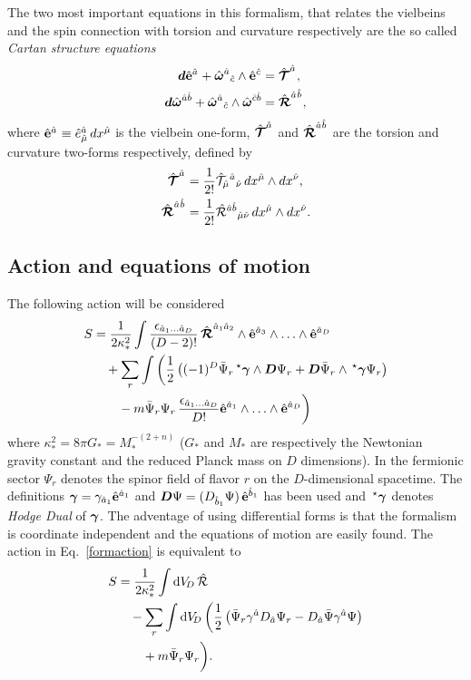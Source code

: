The two most important equations in this formalism, that relates the vielbeins and the spin connection with torsion and curvature respectively are the so called {\it{Cartan structure equations}} 
\begin{align}
  \label{cartantorsion}
  \df\vifhn{a}{} + \wfh^{\hat{a}}{}_{\hat{c}}\wedge\vifhn{c}{} &= \Tfhn{a}{}, \\
  \label{cartancurvature}
  \df\wfh^{\hat{a}\hat{b}} + \wfh^{\hat{a}}{}_{\hat{c}}\wedge\wfh^{\hat{c}\hat{b}} &= \Rfhn{a}{}{b}{},
\end{align}
where $\hat{{\bf{e}}}^{\hat{a}_{}} \equiv \hat{e}^{\hat{a}}_{\hat{\mu}}\,dx^{\hat{\mu}}$ is the vielbein one-form, $\hat{{\boldsymbol{\mathcal{T}}}}^{\hat{a}_{}}$ and $\hat{{\boldsymbol{\mathcal{R}}}}^{\hat{a}_{}\hat{b}_{}}$ are the torsion and curvature two-forms respectively, defined by
\begin{align}
  \hat{{\boldsymbol{\mathcal{T}}}}^{\hat{a}_{}} &= \frac{1}{2!}\hat{\mathcal{T}}_{\hat{\mu}}{}^{\hat{a}}{}_{\hat{\nu}}\,dx^{\hat{\mu}}\wedge dx^{\hat{\nu}},\\
  \hat{{\boldsymbol{\mathcal{R}}}}^{\hat{a}_{}\hat{b}_{}} &= \frac{1}{2!}\hat{{\mathcal{R}}}^{\hat{a}\hat{b}}{}_{\hat{\mu}\hat{\nu}}\,dx^{\hat{\mu}}\wedge dx^{\hat{\nu}}.
\end{align}


\subsection{Action and equations of motion}
The following action will be considered
\begin{align}
  \nonumber
  S &= \frac{1}{2\kappa_*^2}\int\frac{\epsilon_{\hat{a}_1\ldots\hat{a}_D}}{(D-2)!}\,\Rfh^{\hat{a}_1\hat{a}_2}\wedge\vifh^{\hat{a}_3}\wedge\ldots\wedge\vifh^{\hat{a}_D} \\
  \nonumber
  &\quad+ \sum_{r}\int\bigg(\frac{1}{2}\left((-1)^D\bar{\Psi}_r\hodge\gf\wedge\Df\Psi_r + \Df\bar{\Psi}_r\wedge\hodge\gf\Psi_r\right) \\
  \label{formaction}
  &\qquad- m\bar{\Psi}_r\Psi_r\,\frac{\epsilon_{\hat{a}_1\ldots\hat{a}_D}}{D!}\vifh^{\hat{a}_1}\wedge\ldots\wedge\vifh^{\hat{a}_D}\bigg)
\end{align}
where $\kappa_*^2 = 8\pi G_* = M_*^{-(2+n)}$ ($G_*$ and $M_*$ are  respectively the  Newtonian gravity constant and the reduced Planck mass on $D$ dimensions). In the fermionic sector $\Psi_r$ denotes the spinor field of flavor $r$ on the $D$-dimensional spacetime. The definitions ${\boldsymbol{\gamma}} = \gamma_{\hat{a}_1}\hat{{\bf{e}}}^{\hat{a}_1}$ and ${\boldsymbol{D}}\Psi = (D_{\hat{b}_1}\Psi)\,\hat{{\bf{e}}}^{\hat{b}_1}$ has been used and $\,{}^\star{\boldsymbol{\gamma}}$ denotes {\it{Hodge Dual}} of ${\boldsymbol{\gamma}}$. The adventage of using differential forms is that the formalism is coordinate independent and the equations of motion are easily found. The action in Eq.~\eqref{formaction} is equivalent to
\begin{align}
  \nonumber
  S &= \frac{1}{2\kappa_*^2}\int \dv[D]\,\hat{\R} \\ 
  \nonumber
  &\quad -\sum_{r}\int \dv[D]\,\bigg(\frac{1}{2}\left(\bar{\Psi}_r\gamma^{\hat{a}}D_{\hat{a}}\Psi_r - D_{\hat{a}}\bar{\Psi}\gamma^{\hat{a}}\Psi\right)\\
  \label{coordinateaction}
  &\qquad + m\bar{\Psi}_r\Psi_r\bigg).
\end{align}

